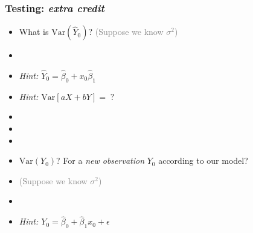 \documentclass[xcolor={dvipsnames}]{beamer}
\begin{document}
\frame
{
 \frametitle{Testing: \emph{extra credit}}

\begin{itemize}
\item
What is $\text{Var}(\hat Y_0)$? \textcolor{gray}{(Suppose we know $\sigma^2$)}
\item[] 
\item[] \emph{Hint: $\hat Y_0 = \hat \beta_0 +  x_0\hat \beta_1  $}
\item[] \emph{Hint: $\text{Var}[aX+bY]=\;?$}
\item[]
\item[]
\item[] 
\item
$\text{Var}(Y_0)$? For a \emph{new observation} $Y_0$ according to our model? 
\item[] \textcolor{gray}{(Suppose we know $\sigma^2$)}
\item[] 
\item \emph{Hint: $Y_0 = \hat \beta_0 +  \hat \beta_1 x_0 + \epsilon$}
\end{itemize}
}
\end{document}
